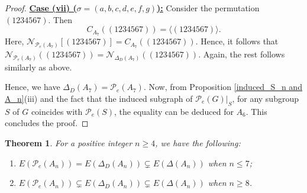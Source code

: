 \documentclass[12pt,a4paper]{article}
\newtheorem{theorem}{Theorem}[section]
\begin{document}
\begin{proof}
\vspace{.3cm}
\noindent\underline{\bf{Case (vii) ($\sigma=(a,b,c,d,e,f,g)$):}} Consider the permutation $(1234567)$. Then \[C_{A_7}((1234567))=\langle(1234567)\rangle.\] Here, $\mathcal{N}_{\mathcal{P}_e(A_7)}[(1234567)]=C_{A_7}((1234567))$. Hence, it follows that $\mathcal{N}_{\mathcal{P}_e(A_7)}((1234567))=\mathcal{N}_{\Delta_D(A_7)}((1234567))$. Again, the rest follows similarly as above.

Hence, we have $\Delta_D(A_7)=\mathcal{P}_e(A_7)$. Now, from Proposition \ref{induced_S_n and A_n}(iii) and the fact that the induced subgraph of $\mathcal{P}_e(G)\vert_S$, for any subgroup $S$ of $G$ coincides with $\mathcal{P}_e(S)$, the equality can be deduced for $A_6$. This concludes the proof. 
\end{proof}

\begin{theorem}\label{Containment of Delta_D for A_n}
For a positive integer $n\geq 4$, we have the following:
\begin{enumerate}[\rm (i)]
\item $E(\mathcal{P}_e(A_n))=E(\Delta_D(A_n))\subsetneq E(\Delta(A_n))$ when $n\leq 7$;
\item $E(\mathcal{P}_e(A_n))\subsetneq E(\Delta_D(A_n))\subsetneq E(\Delta(A_n))$ when $n\geq 8$.
\end{enumerate}
\end{theorem}
\end{document}
